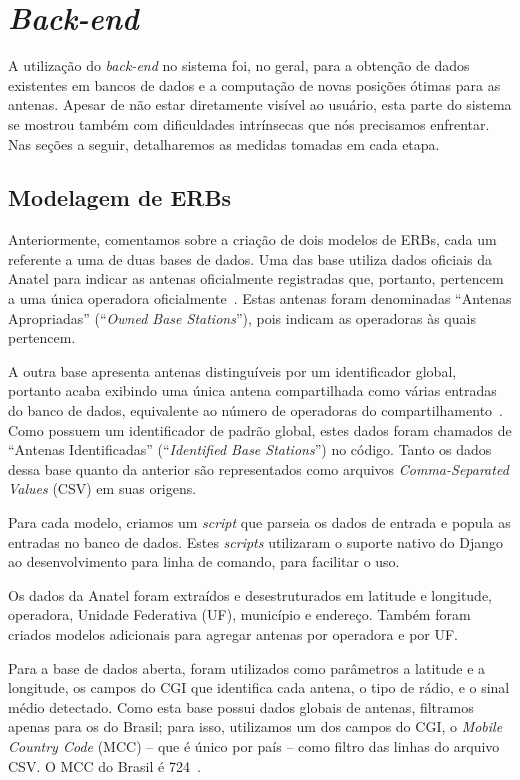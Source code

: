 \documentclass[]{politex}
\begin{document}
\section{\textit{Back-end}}

A utilização do \textit{back-end} no sistema foi, no geral, para a obtenção de
dados existentes em bancos de dados e a computação de novas posições ótimas para
as antenas. Apesar de não estar diretamente visível ao usuário, esta parte do
sistema se mostrou também com dificuldades intrínsecas que nós precisamos
enfrentar. Nas seções a seguir, detalharemos as medidas tomadas em cada etapa.

\subsection{Modelagem de ERBs}

Anteriormente, comentamos sobre a criação de dois modelos de ERBs, cada um
referente a uma de duas bases de dados. Uma das base utiliza dados oficiais da
Anatel para indicar as antenas oficialmente registradas que, portanto, pertencem
a uma única operadora oficialmente~\cite{mapa-erb}. Estas antenas foram
denominadas ``Antenas Apropriadas'' (``\textit{Owned Base Stations}''), pois
indicam as operadoras às quais pertencem.

A outra base apresenta antenas distinguíveis por um identificador global,
portanto acaba exibindo uma única antena compartilhada como várias entradas do
banco de dados, equivalente ao número de operadoras do
compartilhamento~\cite{opencellid}. Como possuem um identificador de padrão
global, estes dados foram chamados de ``Antenas Identificadas''
(``\textit{Identified Base Stations}'') no código. Tanto os dados dessa base
quanto da anterior são representados como arquivos \textit{Comma-Separated
Values} (CSV) em suas origens.

Para cada modelo, criamos um \textit{script} que parseia os dados de entrada e
popula as entradas no banco de dados. Estes \textit{scripts} utilizaram o
suporte nativo do Django ao desenvolvimento para linha de comando, para
facilitar o uso.

Os dados da Anatel foram extraídos e desestruturados em latitude e longitude,
operadora, Unidade Federativa (UF), município e endereço. Também foram criados
modelos adicionais para agregar antenas por operadora e por UF.

Para a base de dados aberta, foram utilizados como parâmetros a latitude e a
longitude, os campos do CGI que identifica cada antena, o tipo de rádio, e o
sinal médio detectado. Como esta base possui dados globais de antenas, filtramos
apenas para os do Brasil; para isso, utilizamos um dos campos do CGI, o
\textit{Mobile Country Code} (MCC) -- que é único por país -- como filtro das
linhas do arquivo CSV. O MCC do Brasil é 724~\cite{mcc-mnc}.
\end{document}
